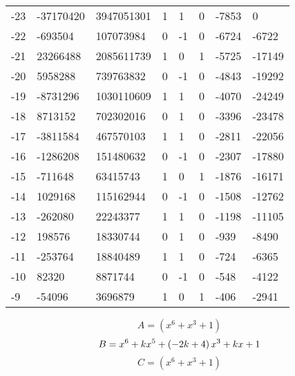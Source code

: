 \documentclass{amsart}
\begin{document}
\begin{longtable}{|l|l|l|lllll|}
-23&-37170420&3947051301&1&1&0&-7853&0\\
-22&-693504&107073984&0&-1&0&-6724&-6722\\
-21&23266488&2085611739&1&0&1&-5725&-17149\\
-20&5958288&739763832&0&-1&0&-4843&-19292\\
-19&-8731296&1030110609&1&1&0&-4070&-24249\\
-18&8713152&702302016&0&1&0&-3396&-23478\\
-17&-3811584&467570103&1&1&0&-2811&-22056\\
-16&-1286208&151480632&0&-1&0&-2307&-17880\\
-15&-711648&63415743&1&0&1&-1876&-16171\\
-14&1029168&115162944&0&-1&0&-1508&-12762\\
-13&-262080&22243377&1&1&0&-1198&-11105\\
-12&198576&18330744&0&1&0&-939&-8490\\
-11&-253764&18840489&1&1&0&-724&-6365\\
-10&82320&8871744&0&-1&0&-548&-4122\\
-9&-54096&3696879&1&0&1&-406&-2941\\
\hline
\end{longtable}
$$A=(x^6
 + x^3
 + 1)$$
$$B=x^6
 + k\*x^5
 + \left(-2\*k
 + 4\right) \*x^3
 + k\*x
 + 1$$
$$C=(x^6
 + x^3
 + 1)$$
\end{document}
